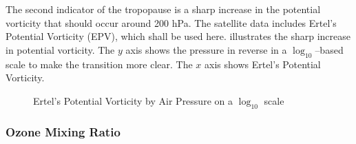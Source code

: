 \documentclass[../00_main.tex]{subfiles}
\begin{document}
The second indicator of the tropopause is a sharp increase in the potential
vorticity that should occur around 200 hPa. The satellite data includes Ertel's
Potential Vorticity (EPV), which shall be used here.  illustrates 
the sharp increase in potential vorticity. The $y$ axis shows the pressure in
reverse in a $\log_{10}$--based scale to make the transition more clear. The
$x$ axis shows Ertel's Potential Vorticity.
\begin{figure}[H]
\center
    \vspace{-20pt}
    \caption{Ertel's Potential Vorticity by Air Pressure on a $\log_{10}$ scale}
    \label{epv}
\end{figure}

\subsubsection{Ozone Mixing Ratio}
\end{document}
